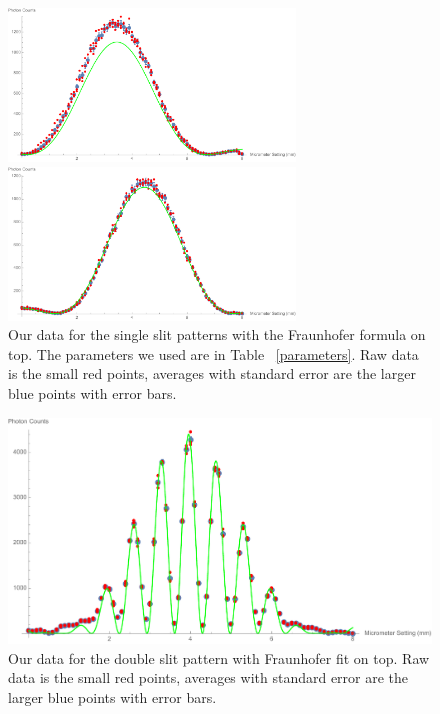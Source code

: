 \documentclass[prb,preprint]{revtex4-1}
\begin{document}
{\begin{figure}[h!]
\centering
\begin{minipage}[b]{0.45\linewidth}
	\includegraphics[width=3in]{far_slit_Fraunhofer_plot.pdf}
\end{minipage}
\quad
\begin{minipage}[b]{0.45\linewidth}
	\includegraphics[width=3in]{near_slit_Fraunhofer_plot.pdf}
\end{minipage}
\caption{Our data for the single slit patterns with the Fraunhofer formula on top. The parameters we used are in Table ~\ref{parameters}. Raw data is the small red points, averages with standard error are the larger blue points with error bars. }
\label{single_slits_Fraunhofer_plot}
\end{figure}

\begin{figure}[h!]
\centering
\includegraphics[width=6in]{double_slit_Fraunhofer_plot.pdf}
\caption{Our data for the double slit pattern with Fraunhofer fit on top.  Raw data is the small red points, averages with standard error are the larger blue points with error bars. }
\label{double_slit_Fraunhofer_plot}
\end{figure}

}
\end{document}
